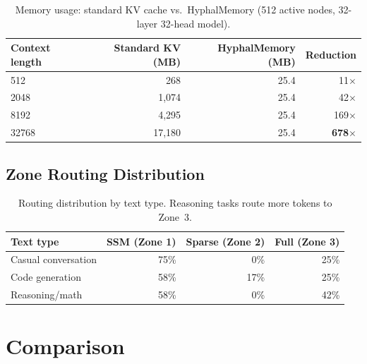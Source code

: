 \documentclass[11pt]{article}
\begin{document}
\begin{table}[h]
\centering
\begin{tabular}{lrrr}
\toprule
Context length & Standard KV (MB) & HyphalMemory (MB) & Reduction \\
\midrule
512   &   268 &  25.4 & 11$\times$ \\
2048  & 1,074 &  25.4 & 42$\times$ \\
8192  & 4,295 &  25.4 & 169$\times$ \\
32768 & 17,180 & 25.4 & \textbf{678$\times$} \\
\bottomrule
\end{tabular}
\caption{Memory usage: standard KV cache vs.\ HyphalMemory (512 active nodes, 32-layer 32-head model).}
\label{tab:memory}
\end{table}

\subsection{Zone Routing Distribution}

\begin{table}[h]
\centering
\begin{tabular}{lrrr}
\toprule
Text type & SSM (Zone 1) & Sparse (Zone 2) & Full (Zone 3) \\
\midrule
Casual conversation & 75\% & 0\% & 25\% \\
Code generation     & 58\% & 17\% & 25\% \\
Reasoning/math      & 58\% & 0\% & 42\% \\
\bottomrule
\end{tabular}
\caption{Routing distribution by text type. Reasoning tasks route more tokens to Zone~3.}
\label{tab:routing}
\end{table}

\section{Comparison}
\label{sec:comparison}
\end{document}
